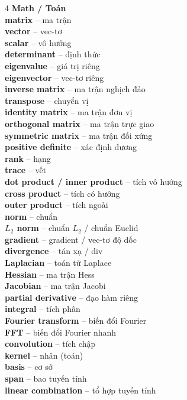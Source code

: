 \begin{multicols}{4}
\textbf{Math / Toán}\\
\textbf{matrix} -- ma trận\\
\textbf{vector} -- vec-tơ\\
\textbf{scalar} -- vô hướng\\
\textbf{determinant} -- định thức\\
\textbf{eigenvalue} -- giá trị riêng\\
\textbf{eigenvector} -- vec-tơ riêng\\
\textbf{inverse matrix} -- ma trận nghịch đảo\\
\textbf{transpose} -- chuyển vị\\
\textbf{identity matrix} -- ma trận đơn vị\\
\textbf{orthogonal matrix} -- ma trận trực giao\\
\textbf{symmetric matrix} -- ma trận đối xứng\\
\textbf{positive definite} -- xác định dương\\
\textbf{rank} -- hạng\\
\textbf{trace} -- vết\\
\textbf{dot product / inner product} -- tích vô hướng\\
\textbf{cross product} -- tích có hướng\\
\textbf{outer product} -- tích ngoài\\
\textbf{norm} -- chuẩn\\
\textbf{$L_2$ norm} -- chuẩn $L_2$ / chuẩn Euclid\\
\textbf{gradient} -- gradient / vec-tơ độ dốc\\
\textbf{divergence} -- tán xạ / div\\
\textbf{Laplacian} -- toán tử Laplace\\
\textbf{Hessian} -- ma trận Hess\\
\textbf{Jacobian} -- ma trận Jacobi\\
\textbf{partial derivative} -- đạo hàm riêng\\
\textbf{integral} -- tích phân\\
\textbf{Fourier transform} -- biến đổi Fourier\\
\textbf{FFT} -- biến đổi Fourier nhanh\\
\textbf{convolution} -- tích chập\\
\textbf{kernel} -- nhân (toán)\\
\textbf{basis} -- cơ sở\\
\textbf{span} -- bao tuyến tính\\
\textbf{linear combination} -- tổ hợp tuyến tính\\

\end{multicols}
